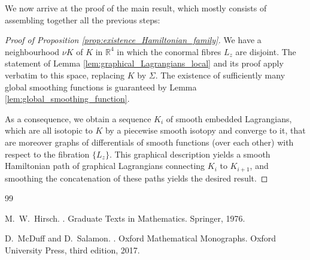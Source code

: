 \documentclass[11pt]{article}
\newcommand{\bR}{\mathbb{R}}
\theoremstyle{definition}
\begin{document}
We now arrive at the proof of the main result, which mostly consists of assembling together all the previous steps:
\begin{proof}[Proof of Proposition \ref{prop:existence_Hamiltonian_family}]
  We have a neighbourhood $\nu K$ of $K$ in $\bR^4$ in which the conormal fibres $L_z$ are disjoint. The statement of Lemma \ref{lem:graphical_Lagrangians_local} and its proof apply verbatim to this space, replacing $K$ by $\Sigma$. The existence of sufficiently many global smoothing functions is guaranteed by Lemma \ref{lem:global_smoothing_function}.

  As a consequence, we obtain a sequence $K_i$ of smooth embedded Lagrangians, which are all isotopic to $K$ by a piecewise smooth isotopy and converge to it, that are moreover graphs of differentials of smooth functions (over each other) with respect to the fibration $\{ L_z \}$. This graphical description yields a smooth Hamiltonian path of graphical Lagrangians connecting $K_i$ to $K_{i+1}$, and smoothing the concatenation of these paths yields the desired result.
\end{proof}


\begin{thebibliography}{99}

M.~W.~Hirsch.
.
\newblock Graduate Texts in Mathematics. Springer, 1976.
  
D.~McDuff and D.~Salamon.
.
\newblock Oxford Mathematical Monographs. Oxford University Press, third edition, 2017.



\end{thebibliography}
\end{document}
